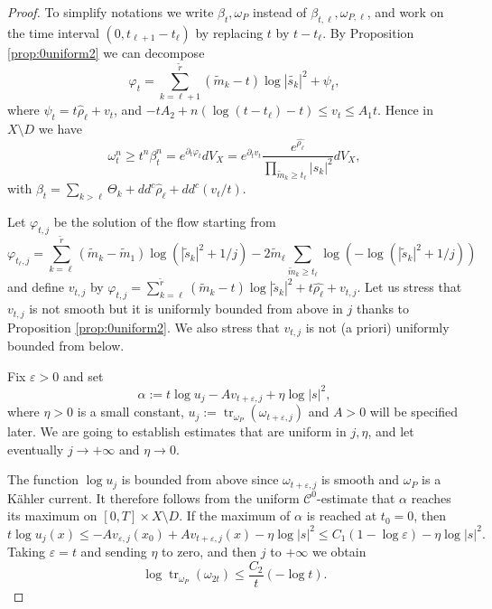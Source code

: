 \documentclass[10pt,a4paper]{amsart}
\numberwithin{equation}{section}
\newcommand{\f}{\varphi}
\newcommand{\p}{\psi}
\newcommand \e {\varepsilon}
\newcommand{\tr}{\operatorname{tr}}
\begin{document}
\begin{proof} 
To simplify notations we write $\beta_t,\omega_P$ instead of $\beta_{t, \ell},\omega_{P,\ell}$,
and work on the time interval $(0,t_{\ell+1}-t_{\ell})$ by replacing $t$ by $t-t_{\ell}$.
By Proposition \ref{prop:0uniform2} we can decompose
$$
\f_t =\sum_{k=\ell+1}^{\tilde{r}} (\tilde{m}_{k}-t) \log |\tilde{s_k}|^2 +\psi_t,
$$
where  $\p_t=t \hat{\rho}_\ell +v_t$, and 
$
-tA_2  +n(\log (t-t_\ell) -t) \leq v_t \leq A_1t.
$
Hence in $X \setminus D$ we have
$$
\omega_t^n\geq t^n \beta_t^n=e^{\partial_t \f_t} dV_X
=e^{\partial_t v_t} \frac{e^{\hat{\rho_\ell}}}{\prod_{\tilde{m}_k \geq t_\ell}|s_k|^2}dV_X,
$$
with $\beta_t=\sum_{k>\ell} \Theta_k+dd^c {\hat{\rho}_\ell}+dd^c (v_t/t)$.

 \smallskip
 
Let $\varphi_{t,j}$ be the solution of the flow starting from 
$$
\varphi_{t_\ell,j}=\sum_{k=\ell}^{\tilde{r}} (\tilde{m}_{k}-\tilde{m}_{1}) \log (|\tilde{s}_k|^2+1/j) -2\tilde{m}_{\ell}\sum_{ \tilde{m}_{k} \geq t_\ell} \log \left(-\log (|\tilde{s}_k|^2+1/j )\right) 
$$
and define $v_{t,j}$ by $\varphi_{t,j}=\sum_{k=\ell}^{\tilde{r}} (\tilde{m}_{k}-t) \log |\tilde{s}_k|^2 +t \hat{\rho_\ell}+v_{t,j}$. 
Let us stress that $v_{t,j}$ is not smooth but it is uniformly bounded from above in $j$ thanks to Proposition \ref{prop:0uniform2}. 
We also stress that $v_{t,j}$ is not (a priori) uniformly bounded from below.

Fix $\e>0$ and set 
$$
\alpha:=t \log u_j-A v_{t+\e,j}+ \eta \log |s|^2,
$$
 where $\eta>0$ is a small constant, 
$u_j:=\tr_{\omega_P} (\omega_{t+\e,j}) $ and $A>0$ will be specified later. 
We are going to establish estimates that are uniform in $j,\eta$, and let eventually
$j \rightarrow +\infty$ and $\eta \rightarrow 0$.

The function $\log u_j$ is bounded from above since $\omega_{t+\e,j}$ is smooth and $\omega_P$ is a K\"ahler current.
It therefore follows from the uniform ${\mathcal C}^0$-estimate that
$\alpha$ reaches its maximum on $[0,T] \times X \setminus D$.
If the maximum of $\alpha$ is reached at $t_0=0$, then
$$
t \log u_j (x) \leq -A v_{\varepsilon, j}(x_0) + Av_{t+\varepsilon, j}(x) -\eta \log |s|^2
\leq C_1 \left(1 -\log \varepsilon \right)  -\eta \log |s|^2. 
$$
Taking $\varepsilon=t$ and sending $\eta$ to zero, and then $j$ to $+\infty$ we obtain
$$
\log \tr_{\omega_P} (\omega_{2t}) \leq \frac{C_2}{t}(-\log t).  
$$


\end{proof}
\end{document}
